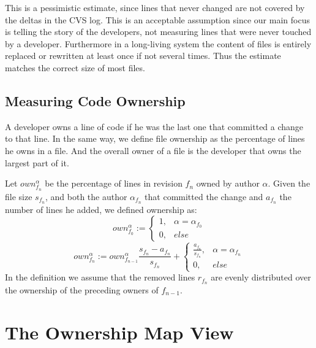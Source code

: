 \documentclass[10pt]{book}
\begin{document}
This is a pessimistic estimate, since lines that never changed are not covered by the deltas in the CVS log. This is an acceptable assumption since our main focus is telling the story of the developers, not measuring lines that were never touched by a developer. Furthermore in a long-living system the content of files is entirely replaced or rewritten at least once if not several times. Thus the estimate matches the correct size of most files.

\subsection{Measuring Code Ownership}

A developer owns a line of code if he was the last one that committed a change to that line. In the same way, we define file ownership as the percentage of lines he owns in a file. And the overall owner of a file is the developer that owns the largest part of it.

Let $own_{f_n}^\alpha$ be the percentage of lines in revision $f_n$ owned by author $\alpha$. Given the file size $s_{f_n}$, and both the author $\alpha_{f_n}$ that committed the change and $a_{f_n}$ the number of lines he added, we defined ownership as:
\[
own_{f_0}^\alpha:=\left\{
    \begin{array}{cl}
        1, & \alpha=\alpha_{f_0} \\
        0, & else
    \end{array}\right.
\]
\[
own_{f_n}^\alpha:=own_{f_{n-1}}^\alpha \frac{s_{f_n} - a_{f_n}}{s_{f_n}} + \left\{
    \begin{array}{cl}
        \frac{a_{f_n}}{s_{f_n}}, & \alpha=\alpha_{f_n} \\
        0, & else
    \end{array}\right.
\]
In the definition we assume that the removed lines $r_{f_n}$ are evenly distributed over the ownership of the preceding owners of $f_{n-1}$.

\section{The Ownership Map View}\label{sec:approach}
\end{document}
